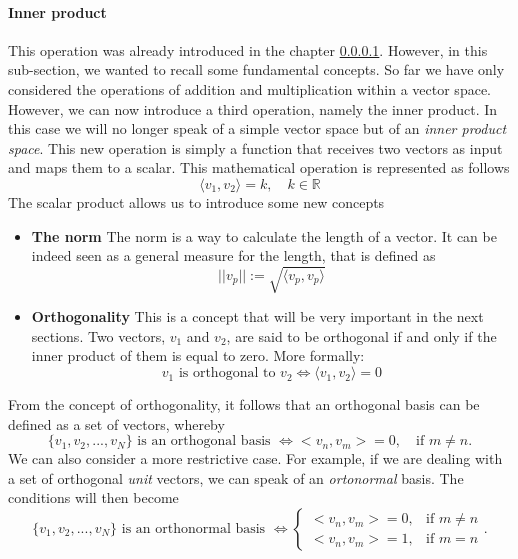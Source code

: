 \paragraph{Inner product}
This operation was already introduced in the chapter \ref{}. However, in this sub-section, we wanted to recall some fundamental concepts.\newline 
So far we have only considered the operations of addition and multiplication within a vector space. However, we can now introduce a third operation, namely the inner product.\newline
In this case we will no longer speak of a simple vector space but of an \emph{inner product space}.
This new operation is simply a function that receives two vectors as input and maps them to a scalar. This mathematical operation is represented as follows
\begin{equation*}
    \langle v_1,v_2 \rangle = k, \quad k \in \mathbb{R}
\end{equation*}
The scalar product allows us to introduce some new concepts
\begin{itemize}
\item \textbf{The norm}\newline
The norm is a way to calculate the length of a vector. It can be indeed seen as a general measure for the length, that is defined as
\begin{equation*}
    ||v_p|| := \sqrt{\langle v_p,v_p \rangle}  
\end{equation*}
\item \textbf{Orthogonality}\newline
This is a concept that will be very important in the next sections.\newline 
Two vectors, $v_1$ and $v_2$, are said to be orthogonal if and only if the inner product of them is equal to zero. More formally:
\begin{equation*}
    \text{$v_1$ is orthogonal to $v_2$} \iff \langle v_1,v_2 \rangle = 0  
\end{equation*}
\end{itemize}
From the concept of orthogonality, it follows that an orthogonal basis can be defined as a set of vectors, whereby
\begin{equation*}
\{v_1,v_2,..., v_N\} \text{ is an orthogonal basis } \iff <v_n, v_m> = 0, \quad \text{if } m \neq n. 
\end{equation*}
We can also consider a more restrictive case. For example, if we are dealing with a set of orthogonal \emph{unit} vectors, we can speak of an \emph{ortonormal} basis. The conditions will then become
\begin{equation*}
\{v_1,v_2,..., v_N\} \text{ is an orthonormal basis } \iff 
\begin{cases} 
    <v_n, v_m>=0, &\text{if } m \neq n \\
    <v_n, v_m>=1, &\text{if } m = n
\end{cases}.
\end{equation*}

